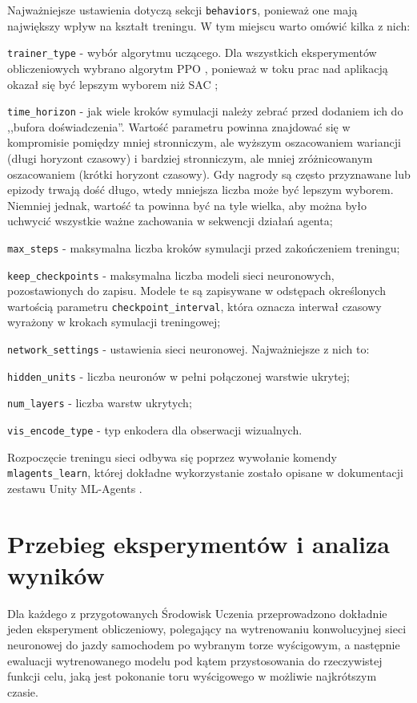 Najważniejsze ustawienia dotyczą sekcji \texttt{behaviors}, ponieważ one mają największy wpływ na kształt treningu. W tym miejscu warto omówić kilka z nich:
\begin{enumerate*}
\item \texttt{trainer\_type} - wybór algorytmu uczącego. Dla wszystkich eksperymentów obliczeniowych wybrano algorytm PPO \cite{ppo:opis}, ponieważ w toku prac nad aplikacją okazał się być lepszym wyborem niż SAC \cite{sac:opis};
\item \texttt{time\_horizon} - jak wiele kroków symulacji należy zebrać przed dodaniem ich do ,,bufora doświadczenia''. Wartość parametru powinna znajdować się w kompromisie pomiędzy mniej stronniczym, ale wyższym oszacowaniem wariancji (długi horyzont czasowy) i bardziej stronniczym, ale mniej zróżnicowanym oszacowaniem (krótki horyzont czasowy). Gdy nagrody są często przyznawane lub epizody trwają dość długo, wtedy mniejsza liczba może być lepszym wyborem. Niemniej jednak, wartość ta powinna być na tyle wielka, aby można było uchwycić wszystkie ważne zachowania w sekwencji działań agenta;
\item \texttt{max\_steps} - maksymalna liczba kroków symulacji przed zakończeniem treningu;
\item \texttt{keep\_checkpoints} - maksymalna liczba modeli sieci neuronowych, pozostawionych do zapisu. Modele te są zapisywane w odstępach określonych wartością parametru \texttt{checkpoint\_interval}, która oznacza interwał czasowy wyrażony w krokach symulacji treningowej; 
\item \texttt{network\_settings} - ustawienia sieci neuronowej. Najważniejsze z nich to:
\begin{itemize*}
\item \texttt{hidden\_units} - liczba neuronów w pełni połączonej warstwie ukrytej;
\item \texttt{num\_layers} - liczba warstw ukrytych;
\item \texttt{vis\_encode\_type} - typ enkodera dla obserwacji wizualnych.
\end{itemize*}
\end{enumerate*}

Rozpoczęcie treningu sieci odbywa się poprzez wywołanie komendy \texttt{mlagents\_learn}, której dokładne wykorzystanie zostało opisane w dokumentacji zestawu Unity ML-Agents \cite{unitymla:trainingMlAgents}.

\section{Przebieg eksperymentów i analiza wyników}
Dla każdego z przygotowanych Środowisk Uczenia przeprowadzono dokładnie jeden eksperyment obliczeniowy, polegający na wytrenowaniu konwolucyjnej sieci neuronowej do jazdy samochodem po wybranym torze wyścigowym, a następnie ewaluacji wytrenowanego modelu pod kątem przystosowania do rzeczywistej funkcji celu, jaką jest pokonanie toru wyścigowego w możliwie najkrótszym czasie.

